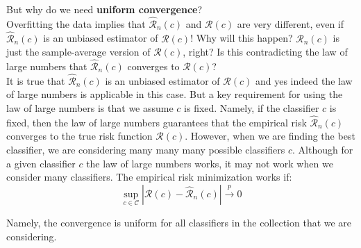 \documentclass[twoside]{article}
\begin{document}
But why do we need \textbf{uniform convergence}?\\ 
Overfitting the data implies that $\mathcal{\hat{R}}_{n}(c)$ and $\mathcal{R}(c)$ are very different, even if $\mathcal{\hat{R}}_{n}(c)$ is an unbiased
estimator of $\mathcal{R}(c)$!
Why will this happen? $\mathcal{\hat{R}}_{n}(c)$ is just the sample-average version of $\mathcal{R}(c)$, right? Is this contradicting the law
of large numbers that $\mathcal{\hat{R}}_{n}(c)$ converges to $\mathcal{R}(c)$?\\
It is true that $\mathcal{\hat{R}}_{n}(c)$ is an unbiased estimator of $\mathcal{R}(c)$ and yes indeed the law of large numbers is applicable
in this case. But a key requirement for using the law of large numbers is that we assume $c$ is fixed. Namely,
if the classifier $c$ is fixed, then the law of large numbers guarantees that the empirical risk $\mathcal{\hat{R}}_{n}(c)$ converges
to the true risk function $\mathcal{R}(c)$.
However, when we are finding the best classifier, we are considering many many many possible classifiers $c$.
Although for a given classifier $c$ the law of large numbers works, it may not work when we consider many
classifiers. The empirical risk minimization works if:
$$\sup_{c \in \mathcal{C}}{|\mathcal{R}(c) - \mathcal{\hat{R}}_{n}(c)|}  \overset{p}{\to} 0$$

Namely, the convergence is uniform for all classifiers in the collection that we are considering.
\end{document}
